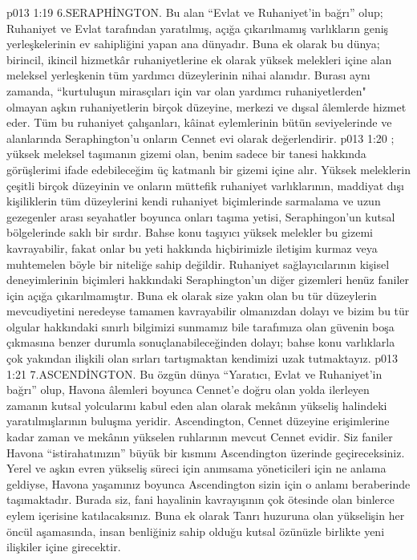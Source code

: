 \vs p013 1:19 6.\bibnobreakspace SERAPHİNGTON. Bu alan “Evlat ve Ruhaniyet’in bağrı” olup; Ruhaniyet ve Evlat tarafından yaratılmış, açığa çıkarılmamış varlıkların geniş yerleşkelerinin ev sahipliğini yapan ana dünyadır. Buna ek olarak bu dünya; birincil, ikincil hizmetkâr ruhaniyetlerine ek olarak yüksek melekleri içine alan meleksel yerleşkenin tüm yardımcı düzeylerinin nihai alanıdır. Burası aynı zamanda, “kurtuluşun mirasçıları için var olan yardımcı ruhaniyetlerden" olmayan aşkın ruhaniyetlerin birçok düzeyine, merkezi ve dışsal âlemlerde hizmet eder. Tüm bu ruhaniyet çalışanları, kâinat eylemlerinin bütün seviyelerinde ve alanlarında Seraphington’u onların Cennet evi olarak değerlendirir.
\vs p013 1:20 ; yüksek meleksel taşımanın gizemi olan, benim sadece bir tanesi hakkında görüşlerimi ifade edebileceğim üç katmanlı bir gizemi içine alır. Yüksek meleklerin çeşitli birçok düzeyinin ve onların müttefik ruhaniyet varlıklarının, maddiyat dışı kişiliklerin tüm düzeylerini kendi ruhaniyet biçimlerinde sarmalama ve uzun gezegenler arası seyahatler boyunca onları taşıma yetisi, Seraphingon’un kutsal bölgelerinde saklı bir sırdır. Bahse konu taşıyıcı yüksek melekler bu gizemi kavrayabilir, fakat onlar bu yeti hakkında hiçbirimizle iletişim kurmaz veya muhtemelen böyle bir niteliğe sahip değildir. Ruhaniyet sağlayıcılarının kişisel deneyimlerinin biçimleri hakkındaki Seraphington’un diğer gizemleri henüz faniler için açığa çıkarılmamıştır. Buna ek olarak size yakın olan bu tür düzeylerin mevcudiyetini neredeyse tamamen kavrayabilir olmanızdan dolayı ve bizim bu tür olgular hakkındaki sınırlı bilgimizi sunmamız bile tarafımıza olan güvenin boşa çıkmasına benzer durumla sonuçlanabileceğinden dolayı; bahse konu varlıklarla çok yakından ilişkili olan sırları tartışmaktan kendimizi uzak tutmaktayız.
\vs p013 1:21 7.\bibnobreakspace ASCENDİNGTON. Bu özgün dünya “Yaratıcı, Evlat ve Ruhaniyet’in bağrı” olup, Havona âlemleri boyunca Cennet’e doğru olan yolda ilerleyen zamanın kutsal yolcularını kabul eden alan olarak mekânın yükseliş halindeki yaratılmışlarının buluşma yeridir. Ascendington, Cennet düzeyine erişimlerine kadar zaman ve mekânın yükselen ruhlarının mevcut Cennet evidir. Siz faniler Havona “istirahatınızın” büyük bir kısmını Ascendington üzerinde geçireceksiniz. Yerel ve aşkın evren yükseliş süreci için anımsama yöneticileri için ne anlama geldiyse, Havona yaşamınız boyunca Ascendington sizin için o anlamı beraberinde taşımaktadır. Burada siz, fani hayalinin kavrayışının çok ötesinde olan binlerce eylem içerisine katılacaksınız. Buna ek olarak Tanrı huzuruna olan yükselişin her öncül aşamasında, insan benliğiniz sahip olduğu kutsal özünüzle birlikte yeni ilişkiler içine girecektir.
